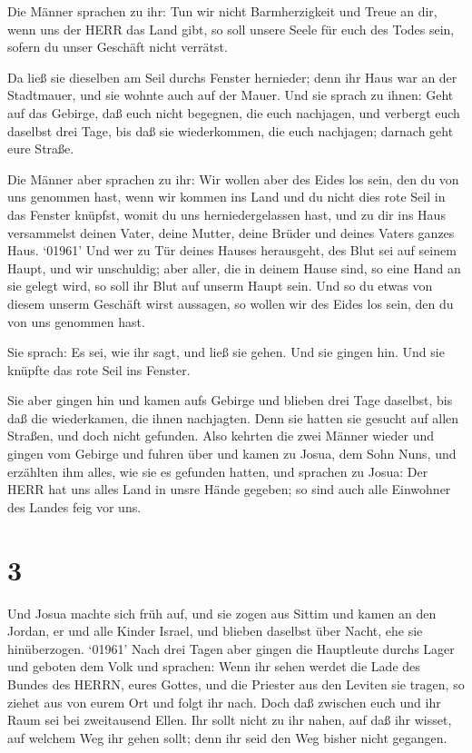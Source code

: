  Die Männer sprachen zu ihr: Tun wir nicht Barmherzigkeit
und Treue an dir, wenn uns der HERR das Land gibt, so soll unsere Seele
für euch des Todes sein, sofern du unser Geschäft nicht verrätst.

 Da ließ sie dieselben am Seil durchs Fenster hernieder;
denn ihr Haus war an der Stadtmauer, und sie wohnte auch auf der Mauer.
 Und sie sprach zu ihnen: Geht auf das Gebirge, daß euch
nicht begegnen, die euch nachjagen, und verbergt euch daselbst drei
Tage, bis daß sie wiederkommen, die euch nachjagen; darnach geht eure
Straße.

 Die Männer aber sprachen zu ihr: Wir wollen aber des Eides
los sein, den du von uns genommen hast,  wenn wir kommen
ins Land und du nicht dies rote Seil in das Fenster knüpfst, womit du
uns herniedergelassen hast, und zu dir ins Haus versammelst deinen
Vater, deine Mutter, deine Brüder und deines Vaters ganzes Haus.
 `01961' Und wer zu Tür deines Hauses herausgeht, des Blut
sei auf seinem Haupt, und wir unschuldig; aber aller, die in deinem
Hause sind, so eine Hand an sie gelegt wird, so soll ihr Blut auf unserm
Haupt sein.  Und so du etwas von diesem unserm Geschäft
wirst aussagen, so wollen wir des Eides los sein, den du von uns
genommen hast.

 Sie sprach: Es sei, wie ihr sagt, und ließ sie gehen. Und
sie gingen hin. Und sie knüpfte das rote Seil ins Fenster.

 Sie aber gingen hin und kamen aufs Gebirge und blieben
drei Tage daselbst, bis daß die wiederkamen, die ihnen nachjagten. Denn
sie hatten sie gesucht auf allen Straßen, und doch nicht gefunden.
 Also kehrten die zwei Männer wieder und gingen vom Gebirge
und fuhren über und kamen zu Josua, dem Sohn Nuns, und erzählten ihm
alles, wie sie es gefunden hatten,  und sprachen zu Josua:
Der HERR hat uns alles Land in unsre Hände gegeben; so sind auch alle
Einwohner des Landes feig vor uns.

\hypertarget{section-2}{%
\section{3}\label{section-2}}

 Und Josua machte sich früh auf, und sie zogen aus Sittim
und kamen an den Jordan, er und alle Kinder Israel, und blieben daselbst
über Nacht, ehe sie hinüberzogen.  `01961' Nach drei Tagen
aber gingen die Hauptleute durchs Lager  und geboten dem
Volk und sprachen: Wenn ihr sehen werdet die Lade des Bundes des HERRN,
eures Gottes, und die Priester aus den Leviten sie tragen, so ziehet aus
von eurem Ort und folgt ihr nach.  Doch daß zwischen euch
und ihr Raum sei bei zweitausend Ellen. Ihr sollt nicht zu ihr nahen,
auf daß ihr wisset, auf welchem Weg ihr gehen sollt; denn ihr seid den
Weg bisher nicht gegangen.

